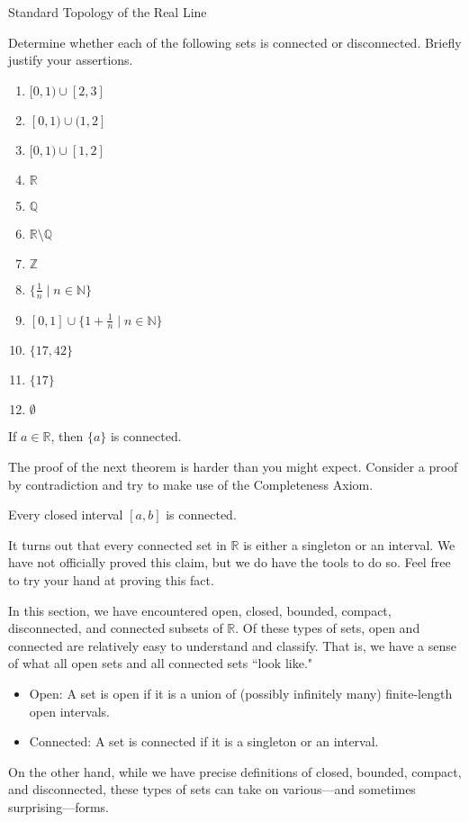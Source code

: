 \begin{section}{Standard Topology of the Real Line}
\begin{problem}
Determine whether each of the following sets is connected or disconnected.  Briefly justify your assertions.
\begin{multicols}{2}
\begin{enumerate}[label=\textrm{(\alph*)}]
\item $[0,1)\cup [2,3]$
\item $[0,1)\cup (1,2]$
\item $[0,1)\cup [1,2]$
\item $\mathbb{R}$
\item $\mathbb{Q}$
\item $\mathbb{R}\setminus\mathbb{Q}$
\item $\mathbb{Z}$
\item $\{\frac{1}{n}\mid n\in\mathbb{N}\}$
\item $[0,1]\cup\{1+\frac{1}{n}\mid n\in\mathbb{N}\}$
\item $\{17,42\}$
\item $\{17\}$
\item $\emptyset$
\end{enumerate}
\end{multicols}
\end{problem}

\begin{theorem}
If $a\in\mathbb{R}$, then $\{a\}$ is connected.
\end{theorem}

The proof of the next theorem is harder than you might expect. Consider a proof by contradiction and try to make use of the Completeness Axiom.

\begin{theorem}\label{thm:closed interval connected}
Every closed interval $[a,b]$ is connected.
\end{theorem}

It turns out that every connected set in $\mathbb{R}$ is either a singleton or an interval. We have not officially proved this claim, but we do have the tools to do so. Feel free to try your hand at proving this fact.

In this section, we have encountered open, closed, bounded, compact, disconnected, and connected subsets of $\mathbb{R}$. Of these types of sets, open and connected are relatively easy to understand and classify. That is, we have a sense of what all open sets and all connected sets ``look like."
\begin{itemize}
\item Open: A set is open if it is a union of (possibly infinitely many) finite-length open intervals.
\item Connected: A set is connected if it is a singleton or an interval.
\end{itemize}
On the other hand, while we have precise definitions of closed, bounded, compact, and disconnected, these types of sets can take on various---and sometimes surprising---forms.


\end{section}
